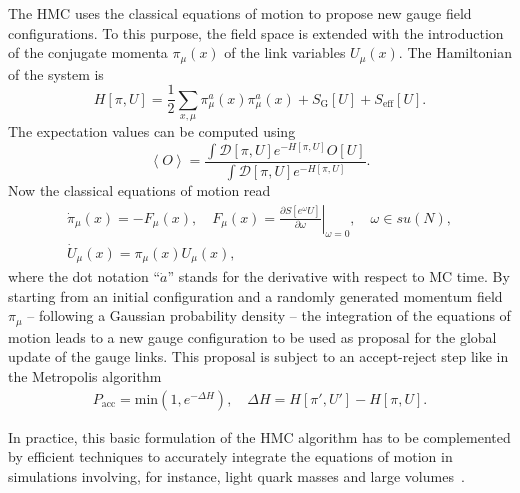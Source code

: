 The HMC uses the classical equations of motion to propose new gauge field configurations. To this purpose, the field space is extended with the introduction of the conjugate momenta $\pi_{\mu}(x)$ of the link variables $U_{\mu}(x)$. The Hamiltonian of the system is
\begin{equation}
H[\pi,U]=\frac{1}{2}\sum_{x,\mu}\pi_{\mu}^a(x)\pi_{\mu}^a(x)+S_{\textrm{G}}[U]+S_{\textrm{eff}}[U].
\end{equation}
The expectation values can be computed using
\begin{equation}
\left<O\right>=\frac{\int\mathcal{D}[\pi,U]e^{-H[\pi,U]}O[U]}{\int\mathcal{D}[\pi,U]e^{-H[\pi,U]}}.
\end{equation}
Now the classical equations of motion read
\begin{gather}
\dot{\pi}_{\mu}(x)=-F_{\mu}(x), \quad F_{\mu}(x)=\left.\frac{\partial S[e^{\omega}U]}{\partial\omega}\right|_{\omega=0}, \quad \omega\in su(N), \\
\dot{U}_{\mu}(x)=\pi_{\mu}(x)U_{\mu}(x),
\end{gather}
where the dot notation ``$\dot{a}$'' stands for the derivative with respect to MC time. By starting from an initial configuration and a randomly generated 
momentum field $\pi_{\mu}$ -- following a Gaussian  probability
density -- the integration of the equations of motion leads to a new gauge configuration to be used as proposal for the global update of the gauge links. This proposal is subject to an accept-reject step like in the Metropolis algorithm
\begin{gather}
P_{\textrm{acc}}=\textrm{min}\left(1,e^{-\Delta H}\right), \quad \Delta H=H[\pi',U']-H[\pi,U].
\end{gather}

In practice, this basic formulation of the HMC algorithm has to be complemented by efficient techniques to accurately integrate the equations of motion in simulations involving, for instance, light quark masses and large volumes~\citep{Weingarten:1991ra,OMELYAN2003272,Hasenbusch:2001ne}.

